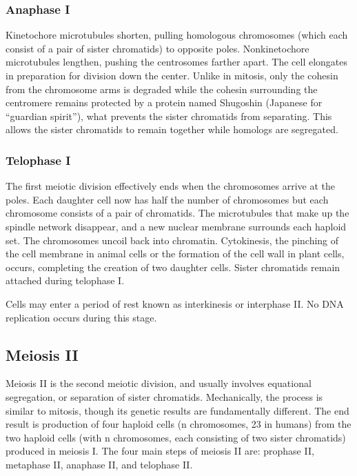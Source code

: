 \hypertarget{anaphase-i}{%
\subsubsection{Anaphase I}\label{anaphase-i}}

Kinetochore microtubules shorten, pulling homologous chromosomes (which each consist of a pair of sister chromatids) to opposite poles. Nonkinetochore microtubules lengthen, pushing the centrosomes farther apart. The cell elongates in preparation for division down the center. Unlike in mitosis, only the cohesin from the chromosome arms is degraded while the cohesin surrounding the centromere remains protected by a protein named Shugoshin (Japanese for ``guardian spirit''), what prevents the sister chromatids from separating. This allows the sister chromatids to remain together while homologs are segregated.

\hypertarget{telophase-i}{%
\subsubsection{Telophase I}\label{telophase-i}}

The first meiotic division effectively ends when the chromosomes arrive at the poles. Each daughter cell now has half the number of chromosomes but each chromosome consists of a pair of chromatids. The microtubules that make up the spindle network disappear, and a new nuclear membrane surrounds each haploid set. The chromosomes uncoil back into chromatin. Cytokinesis, the pinching of the cell membrane in animal cells or the formation of the cell wall in plant cells, occurs, completing the creation of two daughter cells. Sister chromatids remain attached during telophase I.

Cells may enter a period of rest known as interkinesis or interphase II. No DNA replication occurs during this stage.

\hypertarget{meiosis-ii}{%
\subsection{Meiosis II}\label{meiosis-ii}}

Meiosis II is the second meiotic division, and usually involves equational segregation, or separation of sister chromatids. Mechanically, the process is similar to mitosis, though its genetic results are fundamentally different. The end result is production of four haploid cells (n chromosomes, 23 in humans) from the two haploid cells (with n chromosomes, each consisting of two sister chromatids) produced in meiosis I. The four main steps of meiosis II are: prophase II, metaphase II, anaphase II, and telophase II.

